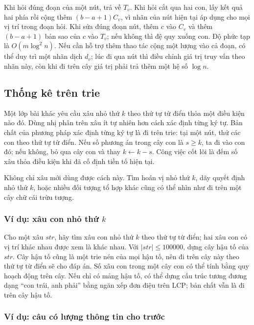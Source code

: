 \documentclass[11pt]{article}
\begin{document}
Khi hỏi đúng đoạn của một nút, trả về \(T_v\). Khi hỏi cắt qua hai con, lấy
kết quả hai phía rồi cộng thêm \((b-a+1)C_v\), vì nhãn của nút hiện tại áp dụng
cho mọi vị trí trong đoạn hỏi. Khi sửa đúng đoạn nút, thêm \(c\) vào \(C_v\)
và thêm \((b-a+1)\) bản sao của \(c\) vào \(T_v\); nếu không thì đệ quy xuống
con. Độ phức tạp là \(O(m\log^2 n)\). Nếu cần hỗ trợ thêm thao tác cộng một
lượng vào cả đoạn, có thể duy trì một nhãn dịch \(d_v\); lúc đi qua nút thì
điều chỉnh giá trị truy vấn theo nhãn này, còn khi đi trên cây giá trị phải trả
thêm một hệ số \(\log n\).

\subsection{Thống kê trên trie}

Một lớp bài khác yêu cầu xâu nhỏ thứ \(k\) theo thứ tự từ điển thỏa một điều
kiện nào đó. Dùng nhị phân trên xâu ít tự nhiên hơn cách xác định từng ký tự.
Bản chất của phương pháp xác định từng ký tự là đi trên trie: tại một nút, thử
các con theo thứ tự từ điển. Nếu số phương án trong cây con là \(s\ge k\), ta
đi vào con đó; nếu không, bỏ qua cây con và thay \(k\leftarrow k-s\). Công việc
cốt lõi là đếm số xâu thỏa điều kiện khi đã cố định tiền tố hiện tại.

Không chỉ xâu mới dùng được cách này. Tìm hoán vị nhỏ thứ \(k\), dãy quyết định
nhỏ thứ \(k\), hoặc nhiều đối tượng tổ hợp khác cũng có thể nhìn như đi trên
một cây chữ cái trừu tượng.

\subsubsection{Ví dụ: xâu con nhỏ thứ \texorpdfstring{\(k\)}{k}}

Cho một xâu \(\mathit{str}\), hãy tìm xâu con nhỏ thứ \(k\) theo thứ tự từ điển;
hai xâu con có vị trí khác nhau được xem là khác nhau. Với \(|\mathit{str}|\le
100000\), dựng cây hậu tố của \(\mathit{str}\). Cây hậu tố cũng là một trie
nén của mọi hậu tố, nên đi trên cây này theo thứ tự từ điển sẽ cho đáp án. Số
xâu con trong một cây con có thể tính bằng quy hoạch động trên cây. Nếu chỉ có
mảng hậu tố, có thể dựng cấu trúc tương đương dạng ``con trái, anh phải'' bằng
ngăn xếp đơn điệu trên LCP; bản chất vẫn là đi trên cây hậu tố.

\subsubsection{Ví dụ: câu có lượng thông tin cho trước}
\end{document}
